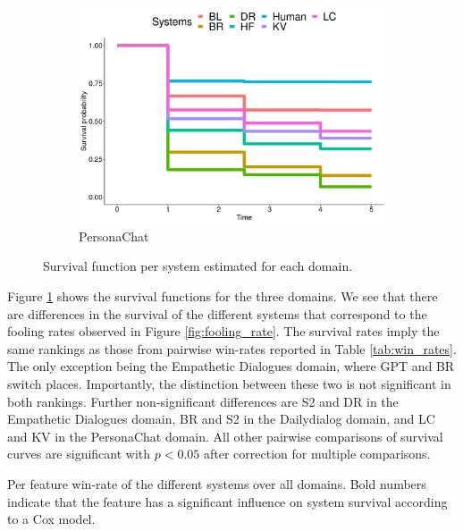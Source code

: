 \documentclass[11pt,a4paper]{article}
\begin{document}
\begin{figure}[h!]
  \begin{subfigure}[b]{0.3\textwidth}
    \includegraphics[width=\textwidth]{figures/survival/convai2_all.png}
    \caption{PersonaChat}
  \end{subfigure}
  \caption{Survival function per system estimated for each domain.}
  \label{fig:survival_all_domains}
\end{figure}

Figure \ref{fig:survival_all_domains} shows the survival functions for the three domains. We see that there are differences in the survival of the different systems that correspond to the fooling rates observed in Figure \ref{fig:fooling_rate}. The survival rates imply the same rankings as those from pairwise win-rates reported in Table \ref{tab:win_rates}. The only exception being the Empathetic Dialogues domain, where GPT and BR switch places. Importantly, the distinction between these two is not significant in both rankings. Further non-significant differences are S2 and DR in the Empathetic Dialogues domain, BR and S2 in the Dailydialog domain, and LC and KV in the PersonaChat domain. All other pairwise comparisons of survival curves are significant with $p  < 0.05$ after correction for multiple comparisons.

\begin{table}[ht]
    \centering
    \small
    
    \caption{Per feature win-rate of the different systems over all domains. Bold numbers indicate that the feature has a significant
    influence on system survival according to a Cox model.}
    \label{tab:survival_features}
\end{table}
\end{document}
